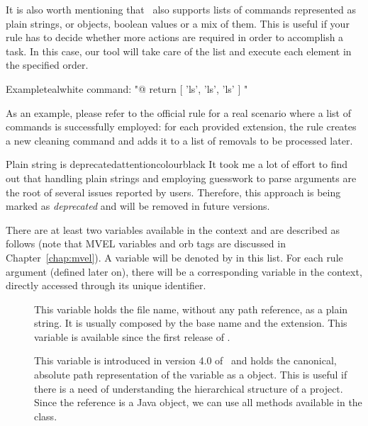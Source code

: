\begin{description}
\begin{description}
It is also worth mentioning that \arara\ also supports lists of commands represented as plain strings,  or  objects, boolean values or a mix of them. This is useful if your rule has to decide whether more actions are required in order to accomplish a task. In this case, our tool will take care of the list and execute each element in the specified order.

\begin{codebox}{Example}{teal}{\icnote}{white}
command: "@{ return [ 'ls', 'ls', 'ls' ] }"
\end{codebox}

As an example, please refer to the official  rule for a real scenario where a list of commands is successfully employed: for each provided extension, the rule creates a new cleaning command and adds it to a list of removals to be processed later.

\begin{messagebox}{Plain string is deprecated}{attentioncolour}{\icattention}{black}
It took me a lot of effort to find out that handling plain strings and employing guesswork to parse arguments are the root of several issues reported by users. Therefore, this approach is being marked as \emph{deprecated} and will be removed in future versions.
\end{messagebox}

There are at least two variables available in the  context and are described as follows (note that \gls{MVEL} variables and orb tags are discussed in Chapter~\ref{chap:mvel}). A variable will be denoted by  in this list. For each rule argument (defined later on), there will be a corresponding variable in the  context, directly accessed through its unique identifier.

\begin{description}
\item[] This variable holds the file name, without any path reference, as a plain string. It is usually composed by the base name and the extension. This variable is available since the first release of \arara.

\item[] This variable is introduced in version 4.0 of \arara\ and holds the canonical, absolute path representation of the  variable as a  object. This is useful if there is a need of understanding the hierarchical structure of a project. Since the reference is a Java object, we can use all methods available in the  class.
\end{description}


\end{description}
\end{description}
